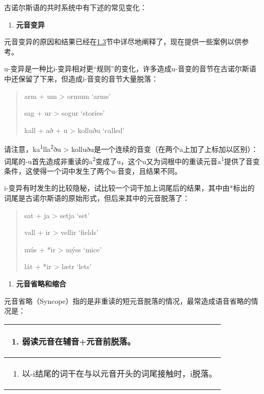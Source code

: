 古诺尔斯语的共时系统中有下述的常见变化：

\begin{enumerate}
\def\labelenumi{\Alph{enumi}.}
\item
  \label{_Ref117017033}{}\textbf{元音变异}
\end{enumerate}

元音变异的原因和结果已经在\hyperref[ux53d8ux5143ux97f3]{1.3}节中详尽地阐释了，现在提供一些案例以供参考。

u-变异是一种比i-变异相对更``规则''的变化，许多造成u-音变的音节在古诺尔斯语中还保留了下来，但造成i-音变的音节大量脱落：

\begin{quote}
arm + um \textgreater{} ormum `arms'

sag + ur \textgreater{} sogur `stories'

kall + að + u \textgreater{} kolluðu `called'
\end{quote}

请注意，ka\textsuperscript{1}lla\textsuperscript{2}ðu \textgreater{}
kolluðu是一个连续的音变（在两个a上加了上标加以区别）：词尾的-u首先造成非重读的a\textsuperscript{2}变成了u，这个u又为词根中的重读元音a\textsuperscript{1}提供了音变条件，这使得一个词中发生了两个u-音变，且结果不同。

i-变异有时发生的比较隐秘，试比较一个词干加上词尾后的结果，其中由*标出的词尾是古诺尔斯语的原始形式，但后来其中的元音脱落了：

\begin{quote}
sat + ja \textgreater{} setja `set'

vall + ir \textgreater{} vellir `fields'

mús + *ir \textgreater{} mýss `mice'

lát + *ir \textgreater{} lætr `lets'
\end{quote}

\begin{enumerate}
\def\labelenumi{\Alph{enumi}.}
\setcounter{enumi}{1}
\item
  \label{_Ref115693879}{}\textbf{元音省略和缩合}
\end{enumerate}

元音省略（Syncope）指的是非重读的短元音脱落的情况，最常造成语音省略的情况是：

\begin{longtable}{l}
\toprule
\begin{enumerate}\def\labelenumi{\arabic{enumi}.}\item  {}\label{_Ref115694569}{}弱读元音在辅音+元音前脱落。\end{enumerate} \\
\midrule
\endhead
\bottomrule
\endfoot
\begin{minipage}[t]{\linewidth}\raggedright
\begin{enumerate}
\def\labelenumi{\arabic{enumi}.}
\setcounter{enumi}{1}
\item
  \label{_Ref115709879}{}以-i结尾的词干在与以元音开头的词尾接触时，i脱落。
\end{enumerate}
\end{minipage} \\
\end{longtable}

